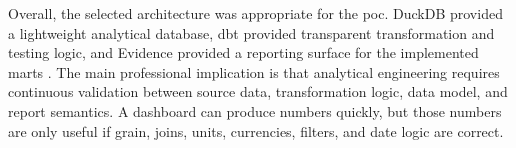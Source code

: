 Overall, the selected architecture was appropriate for the \ac{poc}. DuckDB provided a lightweight analytical database, \ac{dbt} provided transparent transformation and testing logic, and Evidence provided a reporting surface for the implemented marts \parencite{raasveldt_duckdb_2019}. The main professional implication is that analytical engineering requires continuous validation between source data, transformation logic, data model, and report semantics. A dashboard can produce numbers quickly, but those numbers are only useful if grain, joins, units, currencies, filters, and date logic are correct.
